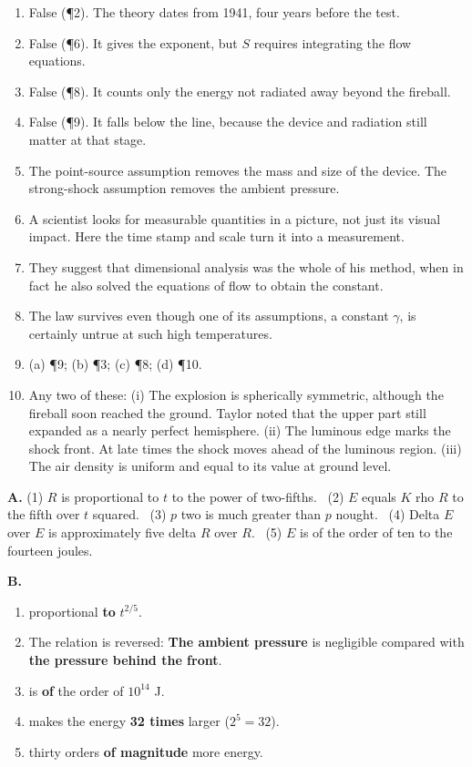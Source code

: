 \documentclass[11pt,a4paper]{article}
\begin{document}
\begin{enumerate}[label=\textbf{\arabic*.}]
  \item False (¶2). The theory dates from 1941, four years before the test.
  \item False (¶6). It gives the exponent, but $S$ requires integrating the flow equations.
  \item False (¶8). It counts only the energy not radiated away beyond the fireball.
  \item False (¶9). It falls below the line, because the device and radiation still matter at that stage.
  \item The point-source assumption removes the mass and size of the device. The strong-shock assumption removes the ambient pressure.
  \item A scientist looks for measurable quantities in a picture, not just its visual impact. Here the time stamp and scale turn it into a measurement.
  \item They suggest that dimensional analysis was the whole of his method, when in fact he also solved the equations of flow to obtain the constant.
  \item The law survives even though one of its assumptions, a constant $\gamma$, is certainly untrue at such high temperatures.
  \item (a) ¶9; (b) ¶3; (c) ¶8; (d) ¶10.\\
  \item Any two of these: (i) The explosion is spherically symmetric, although the fireball soon reached the ground. Taylor noted that the upper part still expanded as a nearly perfect hemisphere. (ii) The luminous edge marks the shock front. At late times the shock moves ahead of the luminous region. (iii) The air density is uniform and equal to its value at ground level.
\end{enumerate}

\textbf{A.}
(1) $R$ is proportional to $t$ to the power of two-fifths. \
(2) $E$ equals $K$ rho $R$ to the fifth over $t$ squared. \
(3) $p$ two is much greater than $p$ nought. \
(4) Delta $E$ over $E$ is approximately five delta $R$ over $R$. \
(5) $E$ is of the order of ten to the fourteen joules.

\textbf{B.}
\begin{enumerate}[label=\textbf{\arabic*.}]
  \item proportional \textbf{to} $t^{2/5}$.
  \item The relation is reversed: \textbf{The ambient pressure} is negligible compared with \textbf{the pressure behind the front}.
  \item is \textbf{of} the order of $10^{14}$ J.
  \item makes the energy \textbf{32 times} larger ($2^5=32$).
  \item thirty orders \textbf{of magnitude} more energy.
\end{enumerate}
\end{document}
